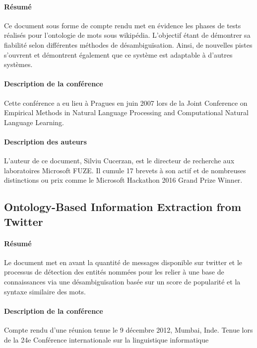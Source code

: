 \documentclass{article}
\begin{document}
\paragraph{Résumé}
Ce document sous forme de compte rendu met en évidence les phases de tests réalisés pour l'ontologie de mots sous wikipédia. L'objectif étant de démontrer sa fiabilité selon différentes méthodes de désambiguïsation. Ainsi, de nouvelles pistes s'ouvrent et démontrent également que ce système est adaptable à d'autres systèmes.

\paragraph{Description de la conférence}
Cette conférence a eu lieu à Pragues en juin 2007 lors de la Joint Conference on Empirical Methods in Natural Language Processing and Computational Natural Language Learning.

\paragraph{Description des auteurs}
L'auteur de ce document, Silviu Cucerzan, est le directeur de recherche aux laboratoires Microsoft FUZE. Il cumule 17 brevets à son actif et de nombreuses distinctions ou prix comme le Microsoft Hackathon 2016 Grand Prize Winner.

\subsection{Ontology-Based Information Extraction from Twitter\cite{article-2}}

\paragraph{Résumé}
Le document met en avant la quantité de messages disponible sur twitter et le processus de détection des entités nommées pour les relier à une base de connaissances via une désambiguïsation basée sur un score de popularité et la syntaxe similaire des mots.

\paragraph{Description de la conférence}

Compte rendu d'une réunion tenue le 9 décembre 2012, Mumbai, Inde. Tenue lors de la 24e Conférence internationale sur la linguistique informatique
\end{document}
